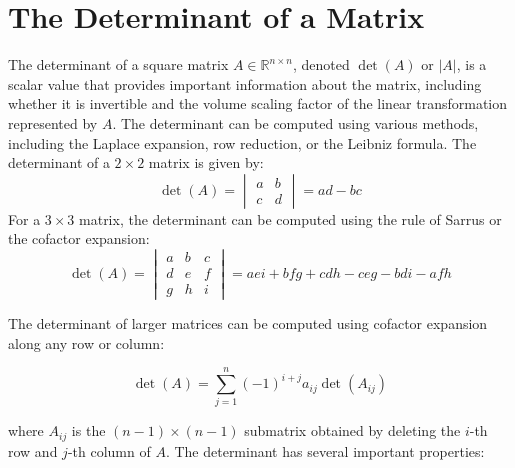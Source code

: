 \section{The Determinant of a Matrix}

The determinant of a square matrix \(A \in \mathbb{R}^{n \times n}\), denoted \(\det(A)\) or \(|A|\), is a scalar value that provides important information about the matrix, including whether it is invertible and the volume scaling factor of the linear transformation represented by \(A\).
The determinant can be computed using various methods, including the Laplace expansion, row reduction, or the Leibniz formula.
The determinant of a \(2 \times 2\) matrix is given by:
\begin{equation*}
\det(A) =
\begin{vmatrix}
a & b \\
c & d
\end{vmatrix}
= ad - bc
\end{equation*}
For a \(3 \times 3\) matrix, the determinant can be computed using the rule of Sarrus or the cofactor expansion:
\begin{equation*}
\det(A) =
\begin{vmatrix}
a & b & c \\
d & e & f \\
g & h & i
\end{vmatrix}
= aei + bfg + cdh - ceg - bdi - afh
\end{equation*}

The determinant of larger matrices can be computed using cofactor expansion along any row or column:

\begin{equation*}
\det(A) = \sum_{j=1}^{n} (-1)^{i+j} a_{ij} \det(A_{ij})
\end{equation*}

where \(A_{ij}\) is the \((n-1) \times (n-1)\) submatrix obtained by deleting the \(i\)-th row and \(j\)-th column of \(A\).
The determinant has several important properties:

